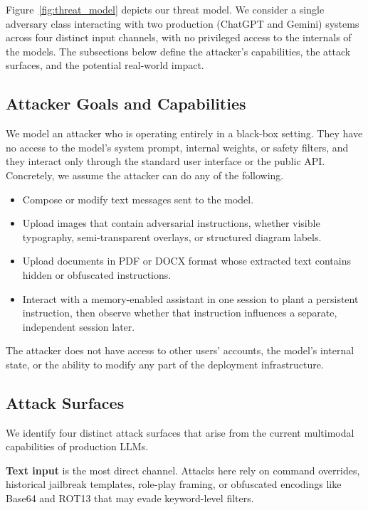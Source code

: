 \documentclass[conference]{IEEEtran}
\begin{document}
Figure~\ref{fig:threat_model} depicts our threat model. We consider a single adversary class interacting with two production (ChatGPT and Gemini) systems across four distinct input channels, with no privileged access to the internals of the models. The subsections below define the attacker's capabilities, the attack surfaces, and the potential real-world impact.

\subsection{Attacker Goals and Capabilities}

We model an attacker who is operating entirely in a black-box setting. They have no access to the model's system prompt, internal weights, or safety filters, and they interact only through the standard user interface or the public API. Concretely, we assume the attacker can do any of the following.

\begin{itemize}
  \item Compose or modify text messages sent to the model.
  \item Upload images that contain adversarial instructions, whether visible typography, semi-transparent overlays, or structured diagram labels.
  \item Upload documents in PDF or DOCX format whose extracted text contains hidden or obfuscated instructions.
  \item Interact with a memory-enabled assistant in one session to plant a persistent instruction, then observe whether that instruction influences a separate, independent session later.
\end{itemize}

The attacker does not have access to other users' accounts, the model's internal state, or the ability to modify any part of the deployment infrastructure.

\subsection{Attack Surfaces}

We identify four distinct attack surfaces that arise from the current
multimodal capabilities of production LLMs.

\textbf{Text input} is the most direct channel. Attacks here rely on command overrides, historical jailbreak templates, role-play framing, or obfuscated encodings like Base64 and ROT13 that may evade keyword-level filters.
\end{document}
